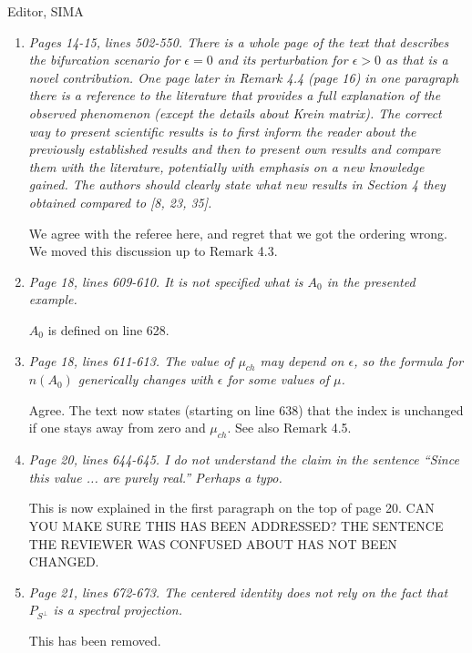\documentclass[11pt]{letter}
\begin{document}
\begin{letter}{Editor, SIMA}
\begin{enumerate}
\item \emph{Pages 14-15, lines 502-550. There is a whole page of the text that describes the bifurcation scenario for $\epsilon = 0$ and its perturbation for $\epsilon > 0$ as that is a novel contribution. One page later in Remark 4.4 (page 16) in one paragraph there is a reference to the literature that provides a full explanation of the observed phenomenon (except the details about Krein matrix). The correct way to present scientific results is to first inform the reader about the previously established results and then to present own results and compare them with the literature, potentially with emphasis on a new knowledge gained. The authors should clearly state what new results in Section 4 they obtained compared to [8, 23, 35].}
\vspace{4mm}

We agree with the referee here, and regret that we got the ordering wrong. We moved this discussion up to Remark 4.3.

\item \emph{Page 18, lines 609-610. It is not specified what is $A_0$ in the presented example.}
\vspace{4mm}

$A_0$ is defined on line 628.

\item \emph{Page 18, lines 611-613. The value of $\mu_{ch}$ may depend on $\epsilon$, so the formula for $n(A_0)$ generically changes with $\epsilon$ for some values of $\mu$.}
\vspace{4mm}

Agree. The text now states (starting on line 638) that the index is unchanged if one stays away from zero and $\mu_{ch}$. See also Remark 4.5.

\item \emph{Page 20, lines 644-645. I do not understand the claim in the sentence ``Since this value ... are purely real.'' Perhaps a typo.}
\vspace{4mm}

This is now explained in the first paragraph on the top of page 20. CAN YOU MAKE SURE THIS HAS BEEN ADDRESSED? THE SENTENCE THE REVIEWER WAS CONFUSED ABOUT HAS NOT BEEN CHANGED.

\item \emph{Page 21, lines 672-673. The centered identity does not rely on the fact that $P_{S^\perp}$ is a spectral projection.}

This has been removed.


\end{enumerate}
\end{letter}
\end{document}
